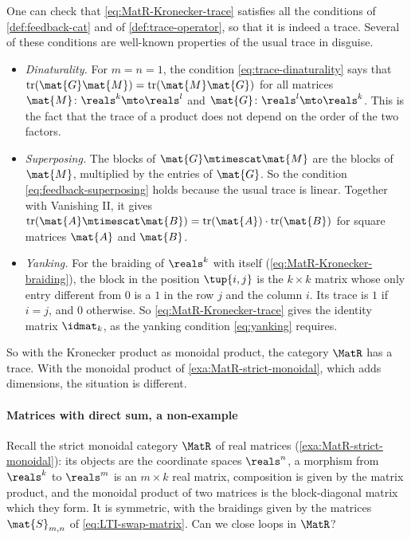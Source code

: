 One can check that \cref{eq:MatR-Kronecker-trace} satisfies all the conditions of \cref{def:feedback-cat} and of \cref{def:trace-operator}, so that it is indeed a trace.
Several of these conditions are well-known properties of the usual trace in disguise.
\begin{itemize}
    \item \emph{Dinaturality.} For $m = n = 1$, the condition \cref{eq:trace-dinaturality} says that $\operatorname{tr}(\mat{G}\mat{M}) = \operatorname{tr}(\mat{M}\mat{G})$ for all matrices $\mat{M} \colon \reals^k \mto \reals^{l}$ and $\mat{G} \colon \reals^{l} \mto \reals^k$. This is the fact that the trace of a product does not depend on the order of the two factors.
    \item \emph{Superposing.} The blocks of $\mat{G} \mtimescat \mat{M}$ are the blocks of $\mat{M}$, multiplied by the entries of $\mat{G}$. So the condition \cref{eq:feedback-superposing} holds because the usual trace is linear. Together with Vanishing II, it gives $\operatorname{tr}(\mat{A} \mtimescat \mat{B}) = \operatorname{tr}(\mat{A}) \cdot \operatorname{tr}(\mat{B})$ for square matrices $\mat{A}$ and $\mat{B}$.
    \item \emph{Yanking.} For the braiding of $\reals^k$ with itself (\cref{eq:MatR-Kronecker-braiding}), the block in the position $\tup{i, j}$ is the $k \times k$ matrix whose only entry different from $0$ is a $1$ in the row $j$ and the column $i$. Its trace is $1$ if $i = j$, and $0$ otherwise. So \cref{eq:MatR-Kronecker-trace} gives the identity matrix $\idmat_k$, as the yanking condition \cref{eq:yanking} requires.
\end{itemize}

So with the Kronecker product as monoidal product, the category $\MatR$ has a trace.
With the monoidal product of \cref{exa:MatR-strict-monoidal}, which adds dimensions, the situation is different.


\paragraph{Matrices with direct sum, a non-example}
\label{sec:feedback-MatR}

Recall the strict monoidal category $\MatR$ of real matrices (\cref{exa:MatR-strict-monoidal}): its objects are the coordinate spaces $\reals^n$, a morphism from $\reals^k$ to $\reals^m$ is an $m \times k$ real matrix, composition is given by the matrix product, and the monoidal product of two matrices is the block-diagonal matrix which they form.
It is symmetric, with the braidings given by the matrices $\mat{S}_{m,n}$ of \cref{eq:LTI-swap-matrix}.
Can we close loops in $\MatR$?

